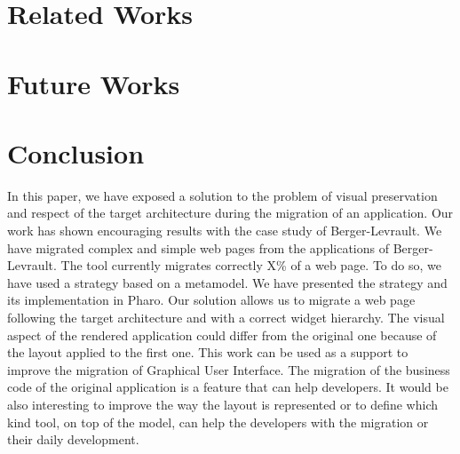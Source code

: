 \documentclass[conference]{IEEEtran}
\begin{document}
    
    
    
    \section{Related Works}
    \label{sec:related}
    
    
    
    \section{Future Works}
    \label{sec:future}
    
    
    \section{Conclusion}
    \label{sec:conclusion}
    
    
    In this paper, we have exposed a solution to the problem of visual preservation
        and respect of the target architecture during the migration of an application.
    Our work has shown encouraging results with the case study of Berger-Levrault.
    We have migrated complex and simple web pages from the applications of Berger-Levrault.
    The tool currently migrates correctly X\% of a web page. %
    To do so, we have used a strategy based on a metamodel.
    We have presented the strategy and its implementation in Pharo.
    Our solution allows us to migrate a web page following the target architecture and
        with a correct widget hierarchy.
    The visual aspect of the rendered application could differ from the original one because of
        the layout applied to the first one.
    This work can be used as a support to improve the migration of Graphical User Interface. 
    The migration of the business code of the original application is
        a feature that can help developers.
    It would be also interesting to improve the way the layout is represented or
        to define which kind tool, on top of the model, can help the developers 
        with the migration or their daily development.
     
\end{document}

